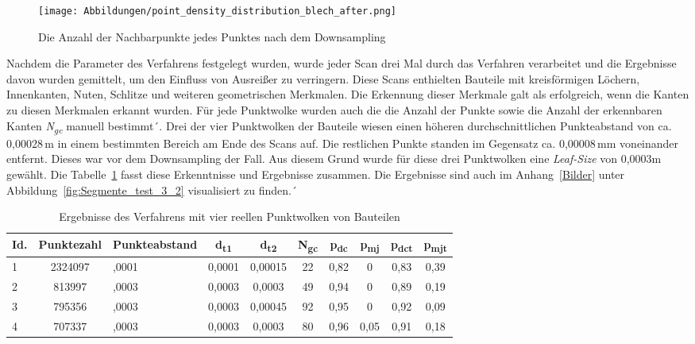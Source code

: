 \begin{figure}[t]
	\texttt{[image: Abbildungen/point\_density\_distribution\_blech\_after.png]}
	\centering
	\caption[Verteilung der Punktedichte nach dem Downsampling]{Die Anzahl der Nachbarpunkte jedes Punktes nach dem Downsampling}
	\label{fig: point_density_after}
\end{figure}

Nachdem die Parameter des Verfahrens festgelegt wurden, wurde jeder Scan drei Mal durch das Verfahren verarbeitet und die Ergebnisse davon wurden gemittelt, um den Einfluss von Ausreißer zu verringern. Diese Scans enthielten Bauteile mit kreisförmigen Löchern, Innenkanten, Nuten, Schlitze und weiteren geometrischen Merkmalen. Die Erkennung dieser Merkmale galt als erfolgreich, wenn die Kanten zu diesen Merkmalen erkannt wurden. Für jede Punktwolke wurden auch die die Anzahl der Punkte sowie die Anzahl der erkennbaren Kanten \textit{N\textsubscript{gc}} manuell bestimmt´. Drei der vier Punktwolken der Bauteile wiesen einen höheren durchschnittlichen Punkteabstand von ca. 0,00028\,\si{\m} in einem bestimmten Bereich am Ende des Scans auf. Die restlichen Punkte standen im Gegensatz ca. 0,00008\,\si{\m}m voneinander entfernt. Dieses war vor dem Downsampling der Fall. Aus diesem Grund wurde für diese drei Punktwolken eine \textit{Leaf-Size} von 0,0003m gewählt. Die Tabelle~\ref{table: test_3-2_results} fasst diese Erkenntnisse und Ergebnisse zusammen. Die Ergebnisse sind auch im Anhang~\ref{Bilder} unter Abbildung~\ref{fig:Segmente_test_3_2} visualisiert zu finden.´

\begin{table}[t]
	\centering
	\begin{tabularx}{\textwidth}{l c >{\centering}X *{7}{c}}
		\hline
		\textbf{Id.} & \textbf{Punktezahl} & \textbf{Punkteabstand} & \textbf{d\textsubscript{t1}} & \textbf{d\textsubscript{t2}} & \textbf{N\textsubscript{gc}} & \textbf{p\textsubscript{dc}} & \textbf{p\textsubscript{mj}} & \textbf{p\textsubscript{dct}} & \textbf{p\textsubscript{mjt}}\\
		\hline
		1 & 2324097 & 0,0001 & 0,0001 & 0,00015 & 22 & 0,82 & 0 & 0,83 & 0,39 \\
		2 & 813997 & 0,0003 & 0,0003 & 0,0003 & 49 & 0,94 & 0 & 0,89 & 0,19 \\
		3 & 795356 & 0,0003 & 0,0003 & 0,00045 & 92 & 0,95 & 0 & 0,92 & 0,09 \\
		4 & 707337 & 0,0003 & 0,0003 & 0,0003 & 80 & 0,96 & 0,05 & 0,91 & 0,18 \\
		\hline
	\end{tabularx}
	\caption{Ergebnisse des Verfahrens mit vier reellen Punktwolken von Bauteilen}
	\label{table: test_3-2_results}
\end{table}

